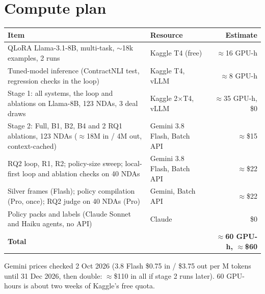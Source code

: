 \documentclass[11pt,a4paper]{article}
\begin{document}
\section{Compute plan}
\begin{table}[H]\footnotesize
\begin{tabularx}{\textwidth}{@{}Lp{3.6cm}r@{}}
\toprule
\textbf{Item} & \textbf{Resource} & \textbf{Estimate} \\
\midrule
QLoRA Llama-3.1-8B, multi-task, $\sim$18k examples, 2 runs & Kaggle T4 (free) & $\approx$16 GPU-h \\
Tuned-model inference (ContractNLI test, regression checks in the loop) & Kaggle T4, vLLM & $\approx$8 GPU-h \\
Stage 1: all systems, the loop and ablations on Llama-8B, 123 NDAs, 3 deal draws & Kaggle 2$\times$T4, vLLM & $\approx$35 GPU-h, \$0 \\
Stage 2: Full, B1, B2, B4 and 2 RQ1 ablations, 123 NDAs ($\approx$18M in / 4M out, context-cached) & Gemini 3.8 Flash, Batch API & $\approx$\$15 \\
RQ2 loop, R1, R2; policy-size sweep; local-first loop and ablation checks on 40 NDAs & Gemini 3.8 Flash, Batch API & $\approx$\$22 \\
Silver frames (Flash); policy compilation (Pro, once); RQ2 judge on 40 NDAs (Pro) & Gemini, Batch API & $\approx$\$22 \\
Policy packs and labels (Claude Sonnet and Haiku agents, no API) & Claude & \$0 \\
\midrule
\textbf{Total} & & \textbf{$\approx$60 GPU-h, $\approx$\$60} \\
\bottomrule
\end{tabularx}
\end{table}
\vspace{-4pt}
{\footnotesize Gemini prices checked 2 Oct 2026 (3.8 Flash \$0.75 in / \$3.75 out per M tokens until 31 Dec 2026, then double: $\approx$\$110 in all if stage 2 runs later). 60 GPU-hours is about two weeks of Kaggle's free quota.}

\end{document}
